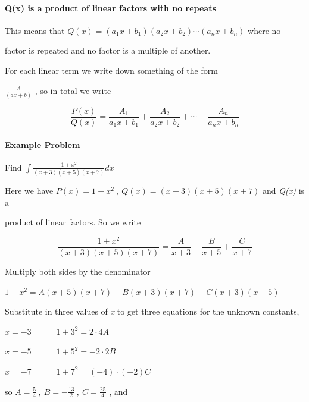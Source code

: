 \paragraph{Q(x) is a product of linear factors with no repeats}



This means that $Q(x)=(a _1x+b _1)(a _2x+b _2)\cdots(a _nx+b _n)$ where no

factor is repeated and no factor is a multiple of another.



For each linear term we write down something of the form

$\frac{A}{(ax+b)}$ , so in total we write



$$\frac{P(x)}{Q(x)}=\frac{A _1}{a _1x+b _1}+\frac{A _2}{a _2x+b _2}+\cdots+\frac{A _n}{a _nx+b _n}$$



\paragraph{Example Problem}



Find $\int\frac{1+x^2}{(x+3)(x+5)(x+7)}dx$



Here we have $P(x)=1+x^2\ ,\ Q(x)=(x+3)(x+5)(x+7)$ and \textit{Q(x)} is a

product of linear factors. So we write



$$\frac{1+x^2}{(x+3)(x+5)(x+7)}=\frac{A}{x+3}+\frac{B}{x+5}+\frac{C}{x+7}$$



Multiply both sides by the denominator



$1+x^2=A(x+5)(x+7)+B(x+3)(x+7)+C(x+3)(x+5)$



Substitute in three values of \textit{x} to get three equations for the unknown constants,



$x=-3 \quad\quad\quad 1+3^2=2\cdot 4 A$

 

$x=-5 \quad\quad\quad 1+5^2=-2\cdot 2 B$



$x=-7 \quad\quad\quad 1+7^2=(-4)\cdot (-2)C$



so $A=\tfrac{5}{4}\ ,\ B=-\tfrac{13}{2}\ ,\ C=\tfrac{25}{4}$ , and



